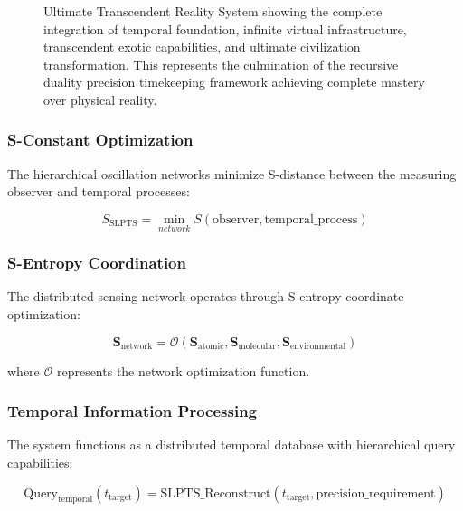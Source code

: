 \documentclass[12pt,a4paper]{article}
\begin{document}
{\begin{figure}[H]
\caption{Ultimate Transcendent Reality System showing the complete integration of temporal foundation, infinite virtual infrastructure, transcendent exotic capabilities, and ultimate civilization transformation. This represents the culmination of the recursive duality precision timekeeping framework achieving complete mastery over physical reality.}
\label{fig:transcendent_system}
\end{figure}

\subsubsection{S-Constant Optimization}

The hierarchical oscillation networks minimize S-distance between the measuring observer and temporal processes:

\begin{equation}
S_{\text{SLPTS}} = \min_{network} S(\text{observer}, \text{temporal\_process})
\end{equation}

\subsubsection{S-Entropy Coordination}

The distributed sensing network operates through S-entropy coordinate optimization:

\begin{equation}
\mathbf{S}_{\text{network}} = \mathcal{O}(\mathbf{S}_{\text{atomic}}, \mathbf{S}_{\text{molecular}}, \mathbf{S}_{\text{environmental}})
\end{equation}

where $\mathcal{O}$ represents the network optimization function.

\subsubsection{Temporal Information Processing}

The system functions as a distributed temporal database with hierarchical query capabilities:

\begin{equation}
\text{Query}_{\text{temporal}}(t_{\text{target}}) = \text{SLPTS\_Reconstruct}(t_{\text{target}}, \text{precision\_requirement})
\end{equation}

}
\end{document}
